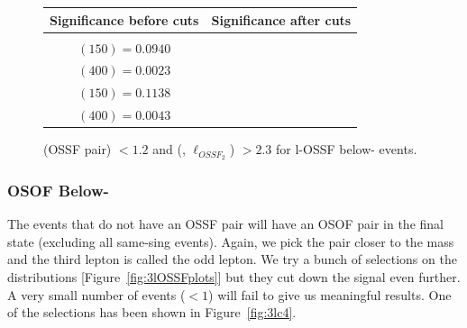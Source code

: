 \documentclass[letterpaper,12pt]{article}
\begin{document}
\begin{figure}[h]
  \vspace{0.6cm}
  \tiny
  \setlength{\tabcolsep}{20pt}
  \renewcommand{\arraystretch}{1.6}
  \begin{tabular}{|c|c|}
    \hline
    Significance before cuts & Significance after cuts\\
    \hline
    \Gape[0.2cm]{\makecell{
        \sig{} $(100) = 0.1192$\\
        \sig{} $(150) = 0.0940$\\
        \sig{} $(400) = 0.0023$ }} & 
    \makecell{
      \sig{} $(100) = 0.1794$\\
      \sig{} $(150) = 0.1138$\\
      \sig{} $(400) = 0.0043$}\\
    \hline
  \end{tabular}
  \caption{\DeltaR{} (OSSF pair) $<1.2$ and \dphi{} (\lodd, $\ell_{OSSF_{2}}$) $>2.3$ for \3l-OSSF below-\Zboson{} events.}
  \label{fig:3lc2}
\end{figure}

\subsubsection{OSOF Below-{\boldmath \Zboson}}
\label{sec:osof}

The events that do not have an OSSF pair will have an OSOF pair in the final state (excluding all same-sing events). Again, we pick the pair closer to the \Zboson{} mass and the third lepton is called the odd lepton. We try a bunch of selections on the distributions [Figure~\ref{fig:3lOSSFplots}] but they cut down the signal even further. A very small number of events ($<1$) will fail to give us meaningful results. One of the selections has been shown in Figure~\ref{fig:3lc4}. 
\end{document}
